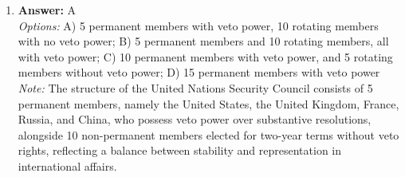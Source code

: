 \documentclass[12pt]{article}
\begin{document}
\begin{enumerate}[label=\arabic*.]
\\ \textit{Note:} The largest increase in peacetime defense spending in American history occurred under Ronald Reagan as part of his administration's strategy to combat perceived threats from the Soviet Union and to enhance U.S. military capabilities during the Cold War.
\item \textbf{Answer:} A
\\ \textit{Options:} A) 5 permanent members with veto power, 10 rotating members with no veto power; B) 5 permanent members and 10 rotating members, all with veto power; C) 10 permanent members with veto power, and 5 rotating members without veto power; D) 15 permanent members with veto power
\\ \textit{Note:} The structure of the United Nations Security Council consists of 5 permanent members, namely the United States, the United Kingdom, France, Russia, and China, who possess veto power over substantive resolutions, alongside 10 non-permanent members elected for two-year terms without veto rights, reflecting a balance between stability and representation in international affairs.
\end{enumerate}
\end{document}
